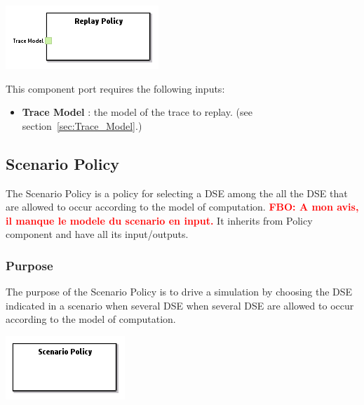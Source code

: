 \documentclass{gemoc} %
\begin{document}
\begin{center}
\includegraphics*[trim=0.0cm 0.0cm 0cm 0.0cm, clip=true]{../images/generated/Generated_Replay_Policy.png}
\end{center}

This component port requires the following inputs:
\begin{itemize}
  \item \textbf{Trace Model} :
the model of the trace to replay.
(see section~\ref{sec:Trace_Model}.)
\end{itemize}



\subsection{Scenario Policy}
\label{sec:Scenario_Policy}
The Scenario Policy is a policy for selecting a DSE among the all the DSE that are allowed to occur according to the model of computation.
\textcolor{red}{\textbf{FBO: A mon avis, il manque le modele du scenario en input.}}
It inherits from Policy component and have all its input/outputs.

\subsubsection{Purpose}
The purpose of the Scenario Policy is to drive a simulation by choosing the DSE indicated in a scenario when several DSE when several DSE are allowed to occur according to the model of computation.

\begin{center}
\includegraphics*[trim=0.0cm 0.0cm 0cm 0.0cm, clip=true]{../images/generated/Generated_Scenario_Policy.png}
\end{center}
\end{document}
